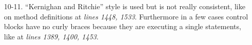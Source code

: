 \begin{itemize}
\item [10-11.] “Kernighan and Ritchie” style is used but is not really consistent, like on method definitions at \textit{lines 1448, 1533}. Furthermore in a few cases control blocks have no curly braces because they are executing a single statements, like at \textit{lines 1389, 1400, 1453}.
\end{itemize}
    